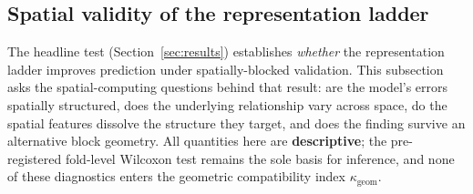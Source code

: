 %

\subsection{Spatial validity of the representation ladder}
\label{sec:spatial-diagnostics}

The headline test (Section~\ref{sec:results}) establishes \emph{whether} the
representation ladder improves prediction under spatially-blocked validation.
This subsection asks the spatial-computing questions behind that result: are
the model's errors spatially structured, does the underlying relationship vary
across space, do the spatial features dissolve the structure they target, and
does the finding survive an alternative block geometry. All quantities here are
\textbf{descriptive}; the pre-registered fold-level Wilcoxon test remains the
sole basis for inference, and none of these diagnostics enters the geometric
compatibility index $\kappa_{\text{geom}}$.


